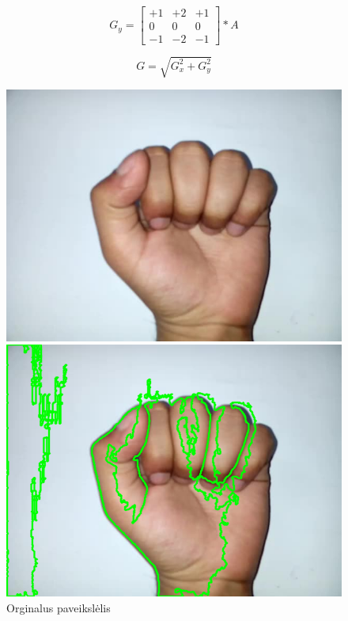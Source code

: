 \documentclass{VUMIFInfKursinis}
\begin{document}
\begin{equation}\label{eq:sobelgy}
	G_y = 
	\begin{bmatrix}
	+1 & +2 & +1 \\
	0 & 0 & 0 \\
	-1 & -2 & -1
	\end{bmatrix} * A
\end{equation}

\begin{equation}\label{eq:sobelg}
G = \sqrt{G_x^2 + G_y^2}
\end{equation}

\begin{figure}[H]
	\begin{minipage}{.3\textwidth}
		\centering
		\includegraphics[width=.8\linewidth]{img/A}
		\caption{Orginalus paveikslėlis}
		\label{img:a-sign}
	\end{minipage}\hspace{\fill}%
	\begin{minipage}{.3\textwidth}
		\centering
		\includegraphics[width=.8\linewidth]{img/A-sobelX}

\end{minipage}
\end{figure}
\end{document}
